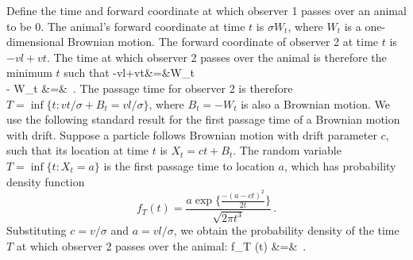 \documentclass[useAMS, usenatbib, referee]{biom}\usepackage[]{graphicx}\usepackage[]{color}
\begin{document}
Define the time and forward coordinate at which observer 1 passes over an animal to be 0. The animal's forward coordinate at time $t$ is $\sigma W_t$, where $W_t$ is a one-dimensional Brownian motion. The forward coordinate of observer 2 at time $t$ is $-vl+vt$. The time at which observer 2 passes over the animal is therefore the minimum $t$ such that
\be
-vl+vt&=&\sigma W_t \nonumber \\
\Rightarrow \;\;\; - W_t &=& \,.
\ee
\noindent
The passage time for observer 2 is therefore $T=\inf\{t: vt/\sigma + B_t = vl/\sigma\}$, where $B_t=-W_t$ is also a Brownian motion. We use the following standard result for the first passage time of a Brownian motion with drift. Suppose a particle follows Brownian motion with drift parameter $c$, such that its location at time $t$ is $X_t=ct+B_t$. The random variable $T=\inf\{t: X_t=a\}$ is the first passage time to location $a$, which has probability density function
\begin{equation}
f_{T} (t) = \frac{ a \exp \Big\{ \frac{- (a-ct)^2}{2t} \Big\} }{\sqrt{2 \pi t^3}}\,.
\end{equation}
\noindent
Substituting $c=v/\sigma$ and $a=vl/\sigma$, we obtain the probability density of the time $T$ at which observer 2 passes over the animal:
\be
f_{T} (t)
&=&
\,.
\ee




\end{document}
